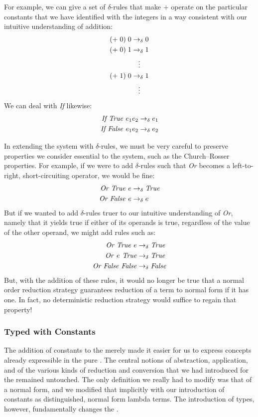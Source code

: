 For example, we can give a set of $\delta$-rules that make $+$ operate on the particular constants that we have identified with the integers in a way consistent with our intuitive understanding of addition:
\begin{align*}
(+\; 0)\; 0 &\dred 0\\
(+\; 0)\; 1 &\dred 1\\
&\hphantom{\rightarrow}\vdots\\
(+\; 1)\; 0 &\dred 1\\
&\hphantom{\rightarrow}\vdots
\end{align*}
We can deal with \textit{If} likewise:
\begin{align*}
\const{If True } e_{1} e_{2} &\dred e_{1}\\
\const{If False } e_{1} e_{2} &\dred e_{2}
\end{align*}

In extending the system with $\delta$-rules, we must be very careful to preserve properties we consider essential to the system, such as the Church--Rosser properties. For example, if we were to add $\delta$-rules such that \textit{Or} becomes a left-to-right, short-circuiting operator, we would be fine:
\begin{align*}
\const{Or True } e &\dred \const{True}\\
\const{Or False } e &\dred e
\end{align*}
But if we wanted to add $\delta$-rules truer to our intuitive understanding of \textit{Or}, namely that it yields true if either of its operands is true, regardless of the value of the other operand, we might add rules such as:
\begin{align*}
\const{Or True } e &\dred \const{True}\\
\const{Or } e \const{ True} &\dred \const{True}\\
\const{Or False False} &\dred \const{False}
\end{align*}
But, with the addition of these rules, it would no longer be true that a normal order reduction strategy guarantees reduction of a term to normal form if it has one. In fact, no deterministic reduction strategy would suffice to regain that property!

\subsubsection{Typed \LambdaCalc with Constants}
The addition of constants to the \lambdacalc merely made it easier for us to express concepts already expressible in the pure \lambdacalc{}. The central notions of abstraction, application, and of the various kinds of reduction and conversion that we had introduced for the \lambdacalc remained untouched. The only definition we really had to modify was that of a normal form, and we modified that implicitly with our introduction of constants as distinguished, normal form lambda terms. The introduction of types, however, fundamentally changes the \lambdacalc{}.

